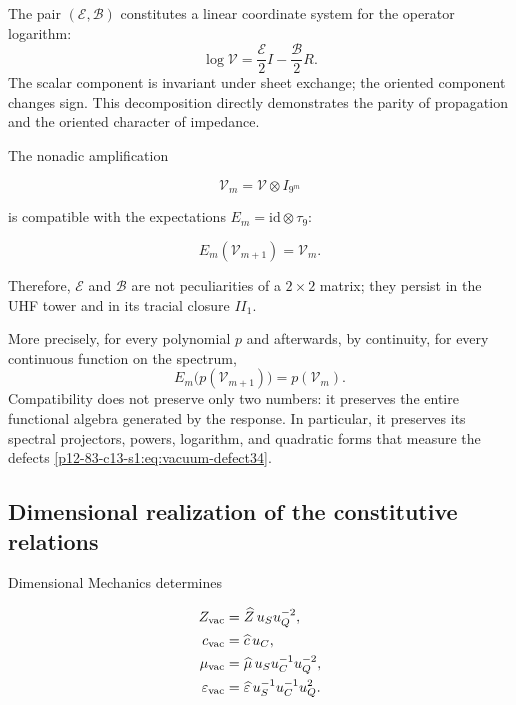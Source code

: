 The pair \((\mathcal E,\mathcal B)\) constitutes a linear coordinate system for the operator
logarithm:
\begin{equation}
\log\mathcal V
=\frac{\mathcal E}{2}I-\frac{\mathcal B}{2}R.
\label{p12-83-c13-s1:eq:vacuum-log-decomposition}
\end{equation}
The scalar component is invariant under sheet exchange; the
oriented component changes sign. This decomposition directly
demonstrates the parity of propagation and the oriented character of
impedance.

The nonadic amplification

\[
\mathcal V_m=\mathcal V\otimes I_{9^m}
\]

is compatible with the expectations \(E_m=\mathrm{id}\otimes\tau_9\):

\[
E_m(\mathcal V_{m+1})=\mathcal V_m.
\]

Therefore, \(\mathcal E\) and \(\mathcal B\) are not peculiarities of a \(2\times2\) matrix; they persist in the UHF tower and in its tracial closure \(II_1\).

More precisely, for every polynomial \(p\) and afterwards, by continuity,
for every continuous function on the spectrum,
\begin{equation}
E_m\bigl(p(\mathcal V_{m+1})\bigr)=p(\mathcal V_m).
\label{p12-83-c13-s1:eq:vacuum-functional-refinement}
\end{equation}
Compatibility does not preserve only two numbers: it preserves the entire
functional algebra generated by the response. In particular, it preserves its
spectral projectors, powers, logarithm, and quadratic forms
that measure the defects \cref{p12-83-c13-s1:eq:vacuum-defect34}.

\subsection{Dimensional realization of the constitutive relations}

Dimensional Mechanics determines

\begin{align}
Z_{\rm vac}&=\widehat Z\,u_Su_Q^{-2},\\
c_{\rm vac}&=\widehat c\,u_C,\\
\mu_{\rm vac}&=\widehat\mu\,u_Su_C^{-1}u_Q^{-2},\\
\varepsilon_{\rm vac}&=\widehat\varepsilon\,u_S^{-1}u_C^{-1}u_Q^2.
\label{p12-83-c13-s1:eq:vacuum-sections}
\end{align}

